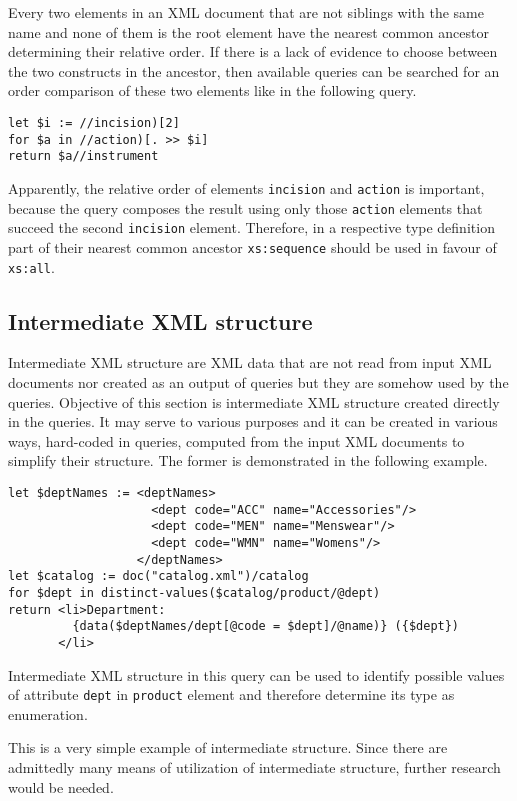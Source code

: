 Every two elements in an XML document that are not siblings with the same name and none of them is the root element have the nearest common ancestor determining their relative order. If there is a lack of evidence to choose between the two constructs in the ancestor, then available queries can be searched for an order comparison of these two elements like in the following query.

\begin{verbatim}
let $i := //incision)[2]
for $a in //action)[. >> $i]
return $a//instrument
\end{verbatim}

Apparently, the relative order of elements \texttt{incision} and \texttt{action} is important, because the query composes the result using only those \texttt{action} elements that succeed the second \texttt{incision} element. Therefore, in a respective type definition part of their nearest common ancestor \texttt{xs:sequence} should be used in favour of \texttt{xs:all}.

\subsection{Intermediate XML structure}
Intermediate XML structure are XML data that are not read from input XML documents nor created as an output of queries but they are somehow used by the queries. Objective of this section is intermediate XML structure created directly in the queries. It may serve to various purposes and it can be created in various ways, hard-coded in queries, computed from the input XML documents to simplify their structure. The former is demonstrated in the following example.

\begin{verbatim}
let $deptNames := <deptNames> 
                    <dept code="ACC" name="Accessories"/> 
                    <dept code="MEN" name="Menswear"/> 
                    <dept code="WMN" name="Womens"/> 
                  </deptNames> 
let $catalog := doc("catalog.xml")/catalog 
for $dept in distinct-values($catalog/product/@dept) 
return <li>Department:
         {data($deptNames/dept[@code = $dept]/@name)} ({$dept})
       </li> 
\end{verbatim}

Intermediate XML structure in this query can be used to identify possible values of attribute \texttt{dept} in \texttt{product} element and therefore determine its type as enumeration.

This is a very simple example of intermediate structure. Since there are admittedly many means of utilization of intermediate structure, further research would be needed.
